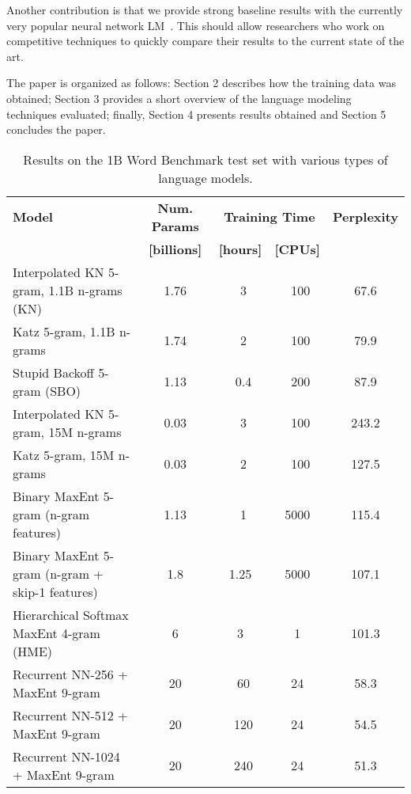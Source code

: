 \documentclass[11pt,letterpaper]{article}
\begin{document}
Another contribution is that we provide strong baseline results with the currently very popular
neural network LM~\cite{Bengio:2003}. This should allow researchers who work
on competitive techniques to quickly compare their results to the current state of the art.

The paper is organized as follows: Section 2 describes how the training data was obtained; Section 3 provides a short overview of the language modeling techniques evaluated; finally, Section 4 presents results obtained and Section 5 concludes the paper.

\begin{table*}
\begin{center}
\begin{tabular}{|l|c|c|c|c|}
\hline
\bf Model                           & \bf Num. Params & \multicolumn{2}{c|}{\bf Training Time} & \bf Perplexity \\
\bf                                 & \bf [billions]  & \bf [hours]            & \bf [CPUs] &    \\
\hline
Interpolated KN 5-gram, 1.1B n-grams (KN) & 1.76      &   ~3                   & ~100 &           67.6 \\
Katz 5-gram, 1.1B n-grams           & 1.74            &   ~2                   & ~100 &           79.9 \\
Stupid Backoff 5-gram (SBO)         & 1.13            &   ~0.4                 & ~200 &           87.9 \\
\hline
Interpolated KN 5-gram, 15M n-grams & 0.03            &   ~3                   & ~100 &          243.2 \\
Katz 5-gram, 15M n-grams            & 0.03            &   ~2                   & ~100 &          127.5 \\
\hline
Binary MaxEnt 5-gram (n-gram features) & 1.13         &   ~1                   &  5000 &         115.4 \\
Binary MaxEnt 5-gram (n-gram + skip-1 features) & 1.8 &   1.25                 &  5000 &         107.1 \\
Hierarchical Softmax MaxEnt 4-gram (HME) &  6         &   3                    &  1    &         101.3 \\
\hline
Recurrent NN-256 + MaxEnt 9-gram    & 20              &   ~60                  &  24   &          58.3 \\
Recurrent NN-512 + MaxEnt 9-gram    & 20              &   ~120                 &  24   &          54.5 \\
Recurrent NN-1024 + MaxEnt 9-gram   & 20              &   ~240                 &  24   &          51.3 \\
\hline
\end{tabular}
\end{center}
\caption{\label{results-table}Results on the 1B Word Benchmark test set with various types of language models.}
\end{table*}
\end{document}
